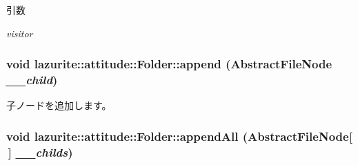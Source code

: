 \begin{DoxyParams}{引数}
\item[{\em visitor}]\end{DoxyParams}
\hypertarget{classlazurite_1_1attitude_1_1_folder_a2d16b4f30cbb594952277aeeee0c753b}{
\subsubsection[{append}]{\setlength{\rightskip}{0pt plus 5cm}void lazurite::attitude::Folder::append ({\bf AbstractFileNode} {\em \_\-\_\-child})}}
\label{classlazurite_1_1attitude_1_1_folder_a2d16b4f30cbb594952277aeeee0c753b}
子ノードを追加します。 \hypertarget{classlazurite_1_1attitude_1_1_folder_aae7705d67896ad15ad4be9d86b865d9e}{
\subsubsection[{appendAll}]{\setlength{\rightskip}{0pt plus 5cm}void lazurite::attitude::Folder::appendAll ({\bf AbstractFileNode}\mbox{[}$\,$\mbox{]} {\em \_\-\_\-childs})}}
\label{classlazurite_1_1attitude_1_1_folder_aae7705d67896ad15ad4be9d86b865d9e}

